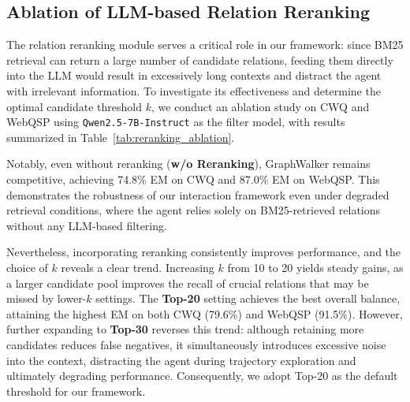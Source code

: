 \subsection{Ablation of LLM-based Relation Reranking}
The relation reranking module serves a critical role in our framework: 
since BM25 retrieval can return a large number of candidate relations, 
feeding them directly into the LLM would result in excessively long contexts 
and distract the agent with irrelevant information. 
To investigate its effectiveness and determine the optimal candidate threshold $k$, we conduct an ablation study on CWQ and WebQSP using \texttt{Qwen2.5-7B-Instruct} as 
the filter model, with results summarized in Table~\ref{tab:reranking_ablation}.

Notably, even without reranking (\textbf{w/o Reranking}), GraphWalker remains 
competitive, achieving 74.8\% EM on CWQ and 87.0\% EM on WebQSP. This 
demonstrates the robustness of our interaction framework even under degraded 
retrieval conditions, where the agent relies solely on BM25-retrieved relations 
without any LLM-based filtering.

Nevertheless, incorporating reranking consistently improves performance, and 
the choice of $k$ reveals a clear trend. Increasing $k$ from 10 to 20 yields 
steady gains, as a larger candidate pool improves the recall of crucial 
relations that may be missed by lower-$k$ settings. The \textbf{Top-20} setting 
achieves the best overall balance, attaining the highest EM on both CWQ 
(79.6\%) and WebQSP (91.5\%). However, further expanding to \textbf{Top-30} 
reverses this trend: although retaining more candidates reduces false negatives, 
it simultaneously introduces excessive noise into the context, distracting the 
agent during trajectory exploration and ultimately degrading performance. 
Consequently, we adopt Top-20 as the default threshold for our framework.

